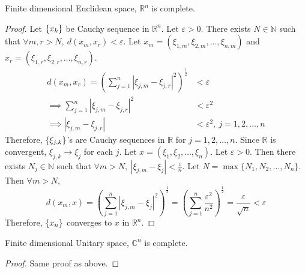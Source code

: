 \begin{theorem}
	Finite dimensional Euclidean space, $\mathbb{R}^n$ is complete.
\end{theorem}
\begin{proof}
	Let $\{x_k\}$ be Cauchy sequence in $\mathbb{R}^n$.
	Let $\varepsilon > 0$.
	There exists $N \in \mathbb{N}$ such that $\forall m,r > N,\ d(x_m,x_r) < \varepsilon$.
	Let $x_m = (\xi_{1,m},\xi_{2,m},\dots,\xi_{n,m})$ and $x_r = (\xi_{1,r},\xi_{2,r},\dots,\xi_{n,r})$.
	\begin{align*}
		d(x_m,x_r) = \left( \sum_{j=1}^n |\xi_{j,m} - \xi_{j,r}|^2 \right)^\frac{1}{2} & <  \varepsilon\\
		\implies \sum_{j=1}^n |\xi_{j,m} - \xi_{j,r}|^2 & <  \varepsilon^2 \\
		\implies |\xi_{j,m} - \xi_{j,r}| & < \varepsilon^2,\ j = 1,2,\dots,n
	\end{align*}
	Therefore, $\{\xi_{j,k}\}$'s are Cauchy sequences in $\mathbb{R}$ for $j = 1,2,\dots,n$.
	Since $\mathbb{R}$ is convergent, $\xi_{j,k} \to \xi_j$ for each $j$.
	Let $x = (\xi_1,\xi_2,\dots,\xi_n)$.
	Let $\varepsilon > 0$.
	Then there exists $N_j \in \mathbb{N}$ such that $\forall m > N,\ |\xi_{j,m} - \xi_j|  < \frac{\varepsilon}{n} $.
	Let $N = \max \{ N_1,N_2,\dots,N_n\}$.
	Then $\forall m > N$,
	$$ d(x_m,x) = \left( \sum_{j=1}^n | \xi_{j,m} - \xi_j|^2 \right)^\frac{1}{2} = \left( \sum_{j=1}^n \frac{\varepsilon^2}{n^2} \right)^\frac{1}{2} = \frac{\varepsilon}{\sqrt{n}} < \varepsilon $$
	Therefore, $\{x_n\}$ converges to $x$ in $\mathbb{R}^n$.
\end{proof}

\begin{theorem}
	Finite dimensional Unitary space, $\mathbb{C}^n$ is complete.
\end{theorem}
\begin{proof}
	Same proof as above.
\end{proof}

